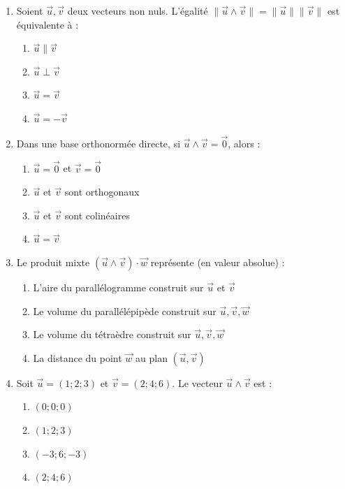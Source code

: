 \documentclass[11pt]{article}
\begin{document}
\begin{exercice}
\begin{enumerate}
    \item Soient $\vec{u}, \vec{v}$ deux vecteurs non nuls. L'égalité $\|\vec{u} \wedge \vec{v}\| = \|\vec{u}\| \|\vec{v}\|$ est équivalente à :
    \begin{enumerate}
        \item $\vec{u} \parallel \vec{v}$
        \item $\vec{u} \perp \vec{v}$
        \item $\vec{u} = \vec{v}$
        \item $\vec{u} = -\vec{v}$
    \end{enumerate}
    \item Dans une base orthonormée directe, si $\vec{u} \wedge \vec{v} = \vec{0}$, alors :
    \begin{enumerate}
        \item $\vec{u} = \vec{0}$ et $\vec{v} = \vec{0}$
        \item $\vec{u}$ et $\vec{v}$ sont orthogonaux
        \item $\vec{u}$ et $\vec{v}$ sont colinéaires
        \item $\vec{u} = \vec{v}$
    \end{enumerate}
    \item Le produit mixte $(\vec{u} \wedge \vec{v}) \cdot \vec{w}$ représente (en valeur absolue) :
    \begin{enumerate}
        \item L'aire du parallélogramme construit sur $\vec{u}$ et $\vec{v}$
        \item Le volume du parallélépipède construit sur $\vec{u}, \vec{v}, \vec{w}$
        \item Le volume du tétraèdre construit sur $\vec{u}, \vec{v}, \vec{w}$
        \item La distance du point $\vec{w}$ au plan $(\vec{u}, \vec{v})$
    \end{enumerate}
    \item Soit $\vec{u} = (1;2;3)$ et $\vec{v} = (2;4;6)$. Le vecteur $\vec{u} \wedge \vec{v}$ est :
    \begin{enumerate}
        \item $(0;0;0)$
        \item $(1;2;3)$
        \item $(-3;6;-3)$
        \item $(2;4;6)$
    \end{enumerate}
\end{enumerate}
\end{exercice}
\end{document}
